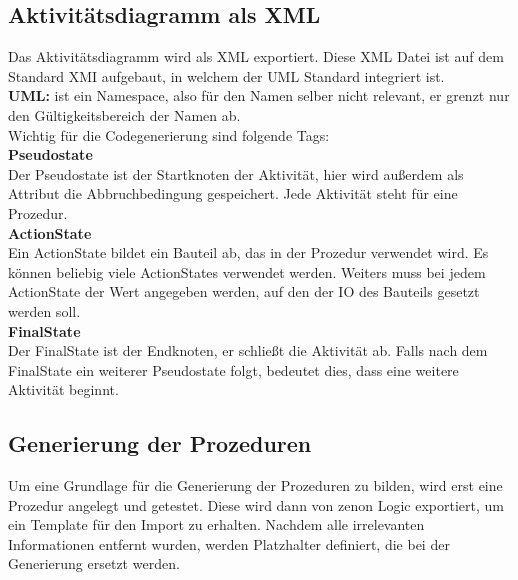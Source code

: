 \subsection{Aktivitätsdiagramm als \ac{XML}}
Das Aktivitätsdiagramm wird als \ac{XML} exportiert. Diese \ac{XML} Datei ist auf dem Standard \ac{XMI} aufgebaut, in welchem der \ac{UML} Standard integriert ist.\\

\textbf{\ac{UML}:} ist ein Namespace, also für den Namen selber nicht relevant, er grenzt nur den Gültigkeitsbereich der Namen ab.\\

Wichtig für die Codegenerierung sind folgende Tags:\\

\textbf{Pseudostate}\\
Der Pseudostate ist der Startknoten der Aktivität, hier wird außerdem als Attribut die Abbruchbedingung gespeichert. Jede Aktivität steht für eine Prozedur.\\


\textbf{ActionState}\\
Ein ActionState bildet ein Bauteil ab, das in der Prozedur verwendet wird. Es können beliebig viele ActionStates verwendet werden. Weiters muss bei jedem ActionState der Wert angegeben werden, auf den der IO des Bauteils gesetzt werden soll.\\


\textbf{FinalState}\\
Der FinalState ist der Endknoten, er schließt die Aktivität ab. Falls nach dem FinalState ein weiterer Pseudostate folgt, bedeutet dies, dass eine weitere Aktivität beginnt.\\


\subsection{Generierung der Prozeduren}
Um eine Grundlage für die Generierung der Prozeduren zu bilden, wird erst eine Prozedur angelegt und getestet. Diese wird dann von zenon Logic exportiert, um ein Template für den Import zu erhalten. Nachdem alle irrelevanten Informationen entfernt wurden, werden Platzhalter definiert, die bei der Generierung ersetzt werden.\\

